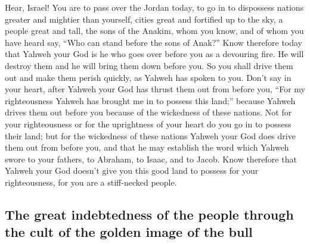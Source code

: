  Hear, Israel! You are to pass over the Jordan today, to
go in to dispossess nations greater and mightier than yourself, cities
great and fortified up to the sky,  a people great and
tall, the sons of the Anakim, whom you know, and of whom you have heard
say, ``Who can stand before the sons of Anak?''  Know
therefore today that Yahweh your God is he who goes over before you as a
devouring fire. He will destroy them and he will bring them down before
you. So you shall drive them out and make them perish quickly, as Yahweh
has spoken to you.  Don't say in your heart, after Yahweh
your God has thrust them out from before you, ``For my righteousness
Yahweh has brought me in to possess this land;'' because Yahweh drives
them out before you because of the wickedness of these nations.
 Not for your righteousness or for the uprightness of your
heart do you go in to possess their land; but for the wickedness of
these nations Yahweh your God does drive them out from before you, and
that he may establish the word which Yahweh swore to your fathers, to
Abraham, to Isaac, and to Jacob.  Know therefore that
Yahweh your God doesn't give you this good land to possess for your
righteousness, for you are a stiff-necked people.

\hypertarget{the-great-indebtedness-of-the-people-through-the-cult-of-the-golden-image-of-the-bull}{%
\subsection{The great indebtedness of the people through the cult of the
golden image of the
bull}\label{the-great-indebtedness-of-the-people-through-the-cult-of-the-golden-image-of-the-bull}}

